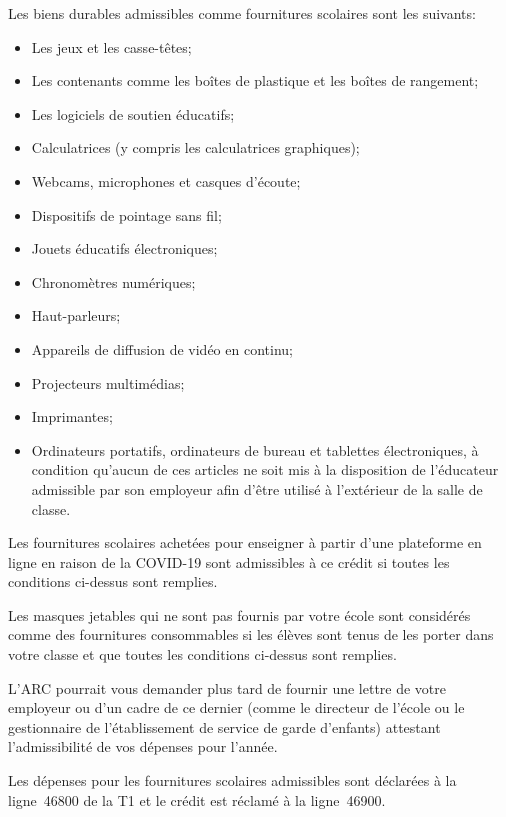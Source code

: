 Les biens durables admissibles comme fournitures scolaires sont les suivants:
\begin{itemize}[label=]
	\item Les jeux et les casse-têtes;
	\item Les contenants comme les boîtes de plastique et les boîtes de rangement;
	\item Les logiciels de soutien éducatifs;
	\item Calculatrices (y compris les calculatrices graphiques);
	\item Webcams, microphones et casques d'écoute;
	\item Dispositifs de pointage sans fil;
	\item Jouets éducatifs électroniques;
	\item Chronomètres numériques;
	\item Haut-parleurs;
	\item Appareils de diffusion de vidéo en continu;
	\item Projecteurs multimédias;
	\item Imprimantes;
	\item Ordinateurs portatifs, ordinateurs de bureau et tablettes électroniques, à condition qu'aucun de ces articles ne soit mis à la disposition de l'éducateur admissible par son employeur afin d'être utilisé à l'extérieur de la salle de classe.
\end{itemize}

\begin{note}
	Les fournitures scolaires achetées pour enseigner à partir d'une plateforme en ligne en raison de la COVID-19 sont admissibles à ce crédit si toutes les conditions ci-dessus sont remplies.
	
	Les masques jetables qui ne sont pas fournis par votre école sont considérés comme des fournitures consommables si les élèves sont tenus de les porter dans votre classe et que toutes les conditions ci-dessus sont remplies.
	
	L'ARC pourrait vous demander plus tard de fournir une lettre de votre employeur ou d'un cadre de ce dernier (comme le directeur de l'école ou le gestionnaire de l'établissement de service de garde d'enfants) attestant l'admissibilité de vos dépenses pour l'année.
\end{note}

Les dépenses pour les fournitures scolaires admissibles sont déclarées à la ligne~46800 de la T1 et le crédit est réclamé à la ligne~46900.



